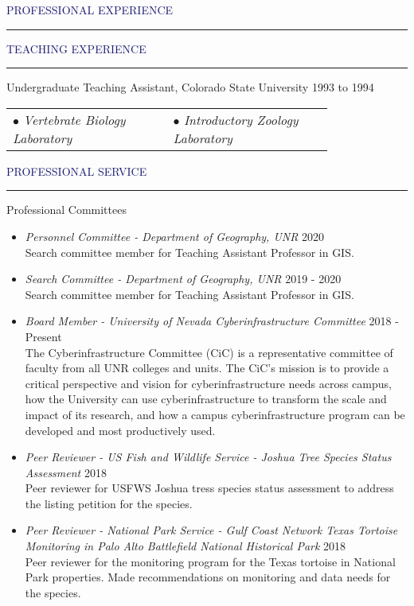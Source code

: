 \documentclass{resume} %
\renewenvironment{rSection}[1]{
\sectionskip
\textcolor{MidnightBlue}{\MakeUppercase{#1}}
\sectionlineskip
\hrule
\begin{list}{}{
\setlength{\leftmargin}{1.5em}
}
\item[]
}{
\end{list}
}
\begin{document}
\begin{rSection}{Professional Experience}
\begin{rSection}{Teaching Experience}
Undergraduate Teaching Assistant, Colorado State University \hfill 1993 to 1994
\begin{center}
\begin{tabular}{p{0.4\linewidth}p{0.4\linewidth}}
	     $\bullet$ \textit{Vertebrate Biology Laboratory} & 
         $\bullet$ \textit{Introductory Zoology Laboratory} \\
\end{tabular}
\end{center}

\end{rSection}

\begin{rSection}{Professional Service}
\begin{rSubsection}{Professional Committees}{}{}{}
\begin{itemize}
\item \textit{Personnel Committee - Department of Geography, UNR} \hfill 2020 \\
Search committee member for Teaching Assistant Professor in GIS.
\item \textit{Search Committee - Department of Geography, UNR} \hfill 2019 - 2020 \\
Search committee member for Teaching Assistant Professor in GIS.
\item \textit{Board Member - University of Nevada Cyberinfrastructure Committee} \hfill 2018 - Present \\
The Cyberinfrastructure Committee (CiC) is a representative committee of faculty from all UNR colleges and units. The CiC's mission is to provide a critical perspective and vision for cyberinfrastructure needs across campus, how the University can use cyberinfrastructure to transform the scale and impact of its research, and how a campus cyberinfrastructure program can be developed and most productively used.

\item \textit{Peer Reviewer - US Fish and Wildlife Service - Joshua Tree Species Status Assessment} \hfill 2018 \\
Peer reviewer for USFWS Joshua tress species status assessment to address the listing petition for the species. 
\item \textit{Peer Reviewer - National Park Service - Gulf Coast Network Texas Tortoise Monitoring in Palo Alto Battlefield National Historical Park
} \hfill 2018 \\
Peer reviewer for the monitoring program for the Texas tortoise in National Park properties. Made recommendations on monitoring and data needs for the species.


\end{itemize}
\end{rSubsection}
\end{rSection}
\end{rSection}
\end{document}
